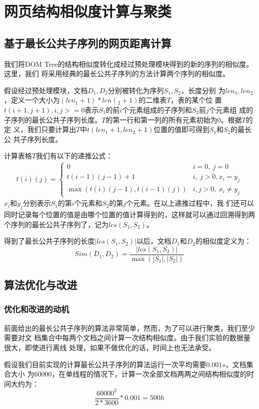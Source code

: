 
\chapter{网页结构相似度计算与聚类}
\label{chap:cluster}
\section{基于最长公共子序列的网页距离计算}
\label{sec:lcs}
我们将DOM Tree的结构相似度转化成经过预处理模块得到的新的序列的相似度。这里，我们
将采用经典的最长公共子序列的方法计算两个序列的相似度。

假设经过预处理模块，文档$D_1,D_2$分别被转化为序列$S_1,S_2$，长度分别
为$len_1,len_2$，定义一个大小为$(len_1+1) * len(_2+1)$的二维表$T$，表的某个位
置$t(i + 1,j + 1),i,j >= 0$表示$S_1$的前$i$个元素组成的子序列和$S_2$前$j$个元素组
成的子序列的最长公共子序列长度。$T$的第一行和第一列的所有元素初始为0。根据$T$的定
义，我们只要计算出$T$中$t(len_1+1, len_2+1)$位置的值即可得到$S_1$和$S_2$的最长公
共子序列长度。

计算表格$T$我们有以下的递推公式：
\begin{eqnarray}
  \label{cluster:eqn:lcs}
  t(i)(j) =
  \begin{cases}
    0 & i = 0,\: j = 0\\
    t(i-1)(j-1) + 1 & i,\: j > 0, x_i=y_j\\
    \max(t(i)(j-1), t(i-1)(j)) & i, j > 0,\: x_i \ne y_j
  \end{cases}
\end{eqnarray}
$x_i$和$y_j$分别表示$S_1$的第$i$个元素和$S_2$的第$j$个元素。在以上递推过程中，我
们还可以同时记录每个位置的值是由哪个位置的值计算得到的，这样就可以通过回溯得到两
个序列的最长公共子序列了，记为$lcs(S_1,S_2)$。

得到了最长公共子序列的长度$|lcs(S_1,S_2)|$以后，文档$D_1$和$D_2$的相似度定义为：
\[
Sim(D_1,D_2)=\frac{|lcs(S_1,S_2)|}{\max(|S_1|,|S_2|)}
\]
\section{算法优化与改进}
\label{sec:optimize}
\subsection{优化和改进的动机}
前面给出的最长公共子序列的算法非常简单，然而，为了可以进行聚类，我们至少需要对文
档集合中每两个文档之间计算一次结构相似度。由于我们实验的数据量很大，即使进行离线
处理，如果不做优化的话，时间上也无法承受。

假设我们目前实现的计算最长公共子序列的算法运行一次平均需要$0.001s$，文档集合大小
为$60000$，在单线程的情况下，计算一次全部文档两两之间结构相似度的时间大约为：
\[
\frac{60000^2}{2 * 3600}*0.001=500h
\]

